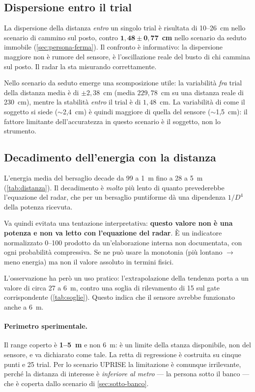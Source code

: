 \subsection{Dispersione entro il trial}

La dispersione della distanza \emph{entro} un singolo trial è risultata di
10--26~cm nello scenario di cammino sul posto, contro
$\mathbf{1{,}48 \pm 0{,}77}$~\textbf{cm} nello scenario da seduto immobile
(\cref{sec:persona-ferma}). Il confronto è informativo: la dispersione maggiore non
è rumore del sensore, è l'oscillazione reale del busto di chi cammina sul posto. Il
radar la sta misurando correttamente.

Nello scenario da seduto emerge una scomposizione utile: la variabilità \emph{fra}
trial della distanza media è di $\pm 2{,}38$~cm (media $229{,}78$~cm su una distanza
reale di 230~cm), mentre la stabilità \emph{entro} il trial è di $1{,}48$~cm. La
variabilità di come il soggetto si siede ($\sim$2,4~cm) è quindi maggiore di quella
del sensore ($\sim$1,5~cm): il fattore limitante dell'accuratezza in questo scenario
è il soggetto, non lo strumento.

\subsection{Decadimento dell'energia con la distanza}

L'energia media del bersaglio decade da 99 a 1~m fino a 28 a 5~m
(\cref{tab:distanza}). Il decadimento è \emph{molto} più lento di quanto
prevederebbe l'equazione del radar, che per un bersaglio puntiforme dà una
dipendenza $1/D^4$ della potenza ricevuta.

Va quindi evitata una tentazione interpretativa: \textbf{questo valore non è una
potenza e non va letto con l'equazione del radar}. È un indicatore normalizzato
0--100 prodotto da un'elaborazione interna non documentata, con ogni probabilità
compressiva. Se ne può usare la monotonia (più lontano $\to$ meno energia) ma non il
valore assoluto in termini fisici.

L'osservazione ha però un uso pratico: l'extrapolazione della tendenza porta a un
valore di circa 27 a 6~m, contro una soglia di rilevamento di 15 sul gate
corrispondente (\cref{tab:soglie}). Questo indica che il sensore avrebbe funzionato
anche a 6~m.

\paragraph{Perimetro sperimentale.} Il range coperto è \textbf{1--5~m} e non 6~m: è
un limite della stanza disponibile, non del sensore, e va dichiarato come tale. La
retta di regressione è costruita su cinque punti e 25 trial. Per lo scenario UPRISE
la limitazione è comunque irrilevante, perché la distanza di interesse è
\emph{inferiore al metro} --- la persona sotto il banco --- che è coperta dallo
scenario di \cref{sec:sotto-banco}.

